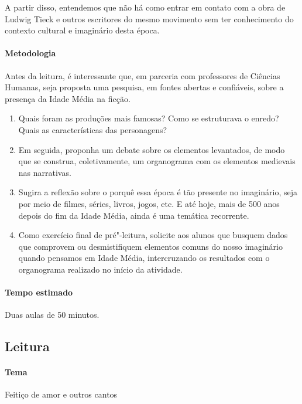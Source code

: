 \documentclass[12pt]{extarticle}
\begin{document}
A partir disso, entendemos que não há como entrar em contato com a obra de Ludwig Tieck 
e outros escritores do mesmo movimento sem ter conhecimento do contexto cultural e 
imaginário desta época.

\paragraph{Metodologia}
Antes da leitura, é interessante que, em parceria com
professores de Ciências Humanas, seja proposta uma pesquisa, em fontes abertas e confiáveis, sobre a
presença da Idade Média na ficção. 

\begin{enumerate}

\item Quais foram as produções mais famosas? Como se estruturava o enredo? 
Quais as características das personagens?

\item 
Em seguida, proponha um debate sobre os elementos levantados, de modo que se construa, coletivamente, 
um organograma com os elementos medievais nas narrativas. 

\item 
Sugira a reflexão sobre o porquê essa
época é tão presente no imaginário, seja por meio de filmes, séries,
livros, jogos, etc. E até hoje, mais de 500 anos depois do fim da Idade Média, ainda é uma temática 
recorrente. 

\item 
Como exercício final de pré"-leitura, solicite aos alunos que busquem dados que
comprovem ou desmistifiquem elementos comuns do nosso imaginário quando
pensamos em Idade Média, intercruzando os resultados com o organograma realizado no início da atividade.

\end{enumerate}

\paragraph{Tempo estimado} Duas aulas de 50 minutos. 

\subsection{Leitura}

\paragraph{Tema} Feitiço de amor e outros cantos
\end{document}
